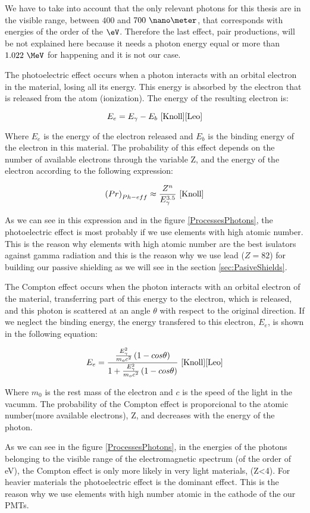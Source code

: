 We have to take into account that the only relevant photons for this thesis are in the visible range, between $400$ and $700~\nano\meter$, that corresponds with energies of the order of the $\eV$. Therefore the last effect, pair productions, will be not explained here because it needs a photon energy equal or more than $1.022~\MeV$ for happening and it is not our case.

The photoelectric effect occurs when a photon interacts with an orbital electron in the material, losing all its energy. This energy is absorbed by the electron that is released from the atom (ionization). The energy of the resulting electron is:

$$E_e = E_\gamma - E_b ~\cite{Knoll}\cite{Leo}$$

Where $E_e$ is the energy of the electron released and $E_b$ is the binding energy of the electron in this material. The probability of this effect depends on the number of available electrons through the variable Z, and the energy of the electron according to the following expression:

$$\left(Pr\right)_{Ph-eff} \approx \frac{Z^n}{E_\gamma^{3.5}}~\cite{Knoll}$$

As we can see in this expression and in the figure \ref{ProcessesPhotons}, the photoelectric effect is most probably if we use elements with high atomic number. This is the reason why elements with high atomic number are the best isulators against gamma radiation and this is the reason why we use lead ($Z=82$) for building our passive shielding as we will see in the section \ref{sec:PasiveShields}. 

The Compton effect occurs when the photon interacts with an orbital electron of the material, transferring part of this energy to the electron, which is released, and this photon is scattered at an angle $\theta$ with respect to the original direction. If we neglect the binding energy, the energy transfered to this electron, $E_e$, is shown in the following equation:

$$E_e=\frac{\frac{E_\gamma^2}{m_oc^2}\left(1-cos\theta\right)}{1+ \frac{E_\gamma^2}{m_oc^2}\left(1-cos\theta\right)}~\cite{Knoll}\cite{Leo}$$

Where $m_0$ is the rest mass of the electron and $c$ is the speed of the light in the vacumm. The probability of the Compton effect is proporcional to the atomic number(more available electrons), Z,  and decreases with the energy of the photon. 

As we can see in the figure \ref{ProcessesPhotons}, in the energies of the photons belonging to the visible range of the electromagnetic spectrum (of the order of eV), the Compton effect is only more likely in very light materials, (Z<4). For heavier materials the photoelectric effect is the dominant effect. This is the reason why we use elements with high number atomic in the cathode of the our PMTs.

